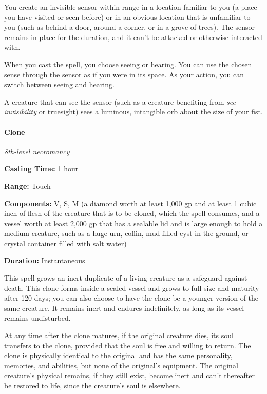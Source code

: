 \documentclass[
]{article}
\begin{document}
You create an invisible sensor within range in a location familiar to
you (a place you have visited or seen before) or in an obvious location
that is unfamiliar to you (such as behind a door, around a corner, or in
a grove of trees). The sensor remains in place for the duration, and it
can't be attacked or otherwise interacted with.

When you cast the spell, you choose seeing or hearing. You can use the
chosen sense through the sensor as if you were in its space. As your
action, you can switch between seeing and hearing.

A creature that can see the sensor (such as a creature benefiting from
\emph{see invisibility} or truesight) sees a luminous, intangible orb
about the size of your fist.

\hypertarget{clone}{%
\paragraph{Clone}\label{clone}}

\emph{8th-level necromancy}

\textbf{Casting Time:} 1 hour

\textbf{Range:} Touch

\textbf{Components:} V, S, M (a diamond worth at least 1,000 gp and at
least 1 cubic inch of flesh of the creature that is to be cloned, which
the spell consumes, and a vessel worth at least 2,000 gp that has a
sealable lid and is large enough to hold a medium creature, such as a
huge urn, coffin, mud-filled cyst in the ground, or crystal container
filled with salt water)

\textbf{Duration:} Instantaneous

This spell grows an inert duplicate of a living creature as a safeguard
against death. This clone forms inside a sealed vessel and grows to full
size and maturity after 120 days; you can also choose to have the clone
be a younger version of the same creature. It remains inert and endures
indefinitely, as long as its vessel remains undisturbed.

At any time after the clone matures, if the original creature dies, its
soul transfers to the clone, provided that the soul is free and willing
to return. The clone is physically identical to the original and has the
same personality, memories, and abilities, but none of the original's
equipment. The original creature's physical remains, if they still
exist, become inert and can't thereafter be restored to life, since the
creature's soul is elsewhere.
\end{document}
